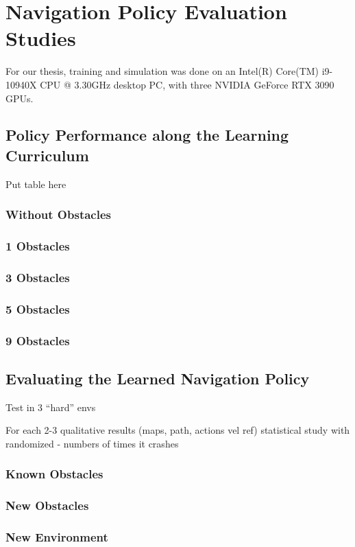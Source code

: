 \chapter{Navigation Policy Evaluation Studies}
\label{chap:7_navigation_policy_evaluation_studies}

\begin{comment}
Evaluation without Obstacles
Evaluation with sparse obstacles out of the way
Evaluation when obstacle avoidance is necessary
\end{comment}


For our thesis, training and simulation was done on an Intel(R) Core(TM) i9-10940X CPU @ 3.30GHz desktop PC, with three NVIDIA GeForce RTX 3090 GPUs. 

\section{Policy Performance along the Learning Curriculum}
Put table here

\subsection{Without Obstacles}
\subsection{1 Obstacles}
\subsection{3 Obstacles}
\subsection{5 Obstacles}
\subsection{9 Obstacles}

\section{Evaluating the Learned Navigation Policy}

Test in 3 ``hard'' envs

For each
2-3 qualitative results (maps, path, actions vel ref)
statistical study with randomized  - numbers of times it crashes

\subsection{Known Obstacles}

\subsection{New Obstacles}

\subsection{New Environment}
